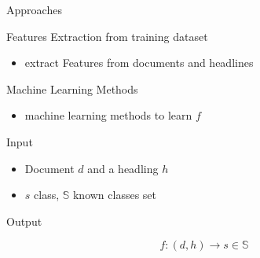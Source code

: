 \documentclass[english,handout]{mlutalk}
\begin{document}
\begin{frame}{Approaches} %
  
  \begin{block}{Features Extraction from training dataset}
    \begin{itemize}
        \item extract Features from documents and headlines  
    \end{itemize}
  \end{block}
  \begin{block}{Machine Learning Methods}
    \begin{itemize}
        \item machine learning methods to learn $f$
    \end{itemize}
  \end{block}
  
  \begin{block}{Input}
  \begin{itemize}
      \item  Document $d$ and a headling $h$
      \item  $s$ class, $\mathbb{S}$ known classes set
  \end{itemize}
  \end{block}
  \begin{block}{Output}
    
    \[f: (d,h) \rightarrow s \in \mathbb{S}\]
   
  \end{block}
\end{frame}
\end{document}
